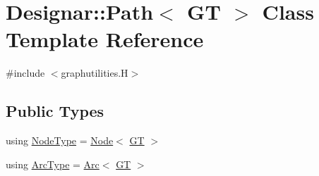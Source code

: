 \hypertarget{class_designar_1_1_path}{}\section{Designar\+:\+:Path$<$ GT $>$ Class Template Reference}
\label{class_designar_1_1_path}


{\ttfamily \#include $<$graphutilities.\+H$>$}

\subsection*{Public Types}
\begin{DoxyCompactItemize}
\item 
using \hyperlink{class_designar_1_1_path_a7b499fd50e96e3360968d4cfef7a3736}{Node\+Type} = \hyperlink{namespace_designar_a5af326c65aa2bd26b26c410f2030d09e}{Node}$<$ \hyperlink{demo-buildgraph_8_c_a3001c40d2c31ca87ed96cd7d1334a55e}{GT} $>$
\item 
using \hyperlink{class_designar_1_1_path_a6e13966351659cedcf3233098b2b7384}{Arc\+Type} = \hyperlink{namespace_designar_a3f55fb5513d62ff47cbc8f72b8e95d6f}{Arc}$<$ \hyperlink{demo-buildgraph_8_c_a3001c40d2c31ca87ed96cd7d1334a55e}{GT} $>$
\end{DoxyCompactItemize}
